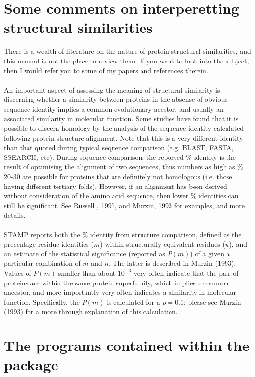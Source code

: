 \section{Some comments on interperetting structural similarities}

There is a wealth of literature on the nature of protein structural similarities, 
and this manual is not the place to review them.  If you want to look into
the subject, then I would refer you to some of my papers \cite{rb94,russell97b,russell98a}
and references therein.\\
\\
An important aspect of assessing the meaning of structural similarity is discerning whether
a similarity between proteins in the absense of obvious sequence identity implies a common
evolutionary acestor, and usually an associated similarity in molecular function.  Some studies
have found that it is possible to discern homology by the analysis of the sequence identity
calculated following protein structure alignment.  Note that this is a very different 
identity than that quoted during typical sequence comparison (e.g. BLAST, FASTA, SSEARCH, etc).
During sequence comparison, the reported \% identity is the result of optimising the alignment of
two sequences, thus numbers as high as \% 20-30 are possible for proteins that are definitely
not homologous (i.e. those having different tertiary folds).  However, if an alignment has been
derived without consideration of the amino acid sequence, then lower \% identities can still
be significant.  See Russell \ea, 1997, and Murzin, 1993 for examples, and more details.\\ 
\\
\nocite{murzin93}
STAMP reports both the \% identity from structure comparison, defined as the precentage 
residue identities ($m$) within structurally equivalent residues ($n$), and an estimate of the statistical
significance (reported as $P(m)$) of a given a particular combination of $m$ and $n$.  The latter is
described in Murzin (1993).  Values of $P(m)$ smaller than about $10^{-3}$ very often indicate that
the pair of proteins are within the same protein superfamily, which implies a common
ancestor, and more importantly very often indicates a similarity in molecular function.  Specifically,
the $P(m)$ is calculated for a $p = 0.1$; please see Murzin (1993) for a more through explanation
of this calculation.

\section{The programs contained within the package}

